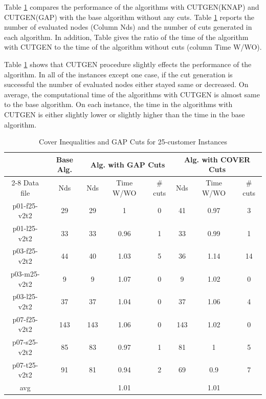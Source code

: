 Table \ref{knpgap25} compares the performance of the algorithms with
CUTGEN(KNAP) and CUTGEN(GAP) with the base algorithm without any cuts.
Table \ref{knpgap25} reports the number of evaluated nodes (Column Nds)
and the number of cuts generated in each algorithm. In addition, Table gives
the ratio of the time of the algorithm with CUTGEN to the time of the algorithm
without cuts (column Time W/WO).

Table \ref{knpgap25} shows that CUTGEN procedure slightly effects the
performance of the algorithm.  In all of the instances except one case,
if the cut generation is successful the number of evaluated nodes
either stayed same or decreased. On average, the computational time
of the algorithms with CUTGEN is almost same to the base algorithm.
On each instance, the time in the algorithms with CUTGEN is either slightly
lower or slightly higher than the time in the base algorithm.

\begin{table}[h!tbp]
\centering
\caption{Cover Inequalities and GAP Cuts for 25-customer Instances}\label{knpgap25}
\begin {tabular}[t]{|c|c|c|c|c|c|c|c|}
\hline
\mbox{} & Base Alg. & \multicolumn{3}{|c|}{Alg. with GAP Cuts} & \multicolumn{3}{|c|}{Alg. with COVER Cuts} \\\cline{2-8}
Data file & Nds & Nds & Time W/WO & \# cuts & Nds & Time W/WO & \# cuts \\\hline
p01-f25-v2t2 &  29 &    29 &    1       & 0 &   41 &    0.97    & 3 \\
p01-l25-v2t2 &  33 &    33 &    0.96    & 1 &   33 &    0.99    & 1 \\
p03-f25-v2t2 &  44 &    40 &    1.03    & 5 &   36 &    1.14    & 14    \\
p03-m25-v2t2 &  9 & 9 & 1.07    & 0 &   9  &    1.02    & 0 \\
p03-l25-v2t2 &  37 &    37 &    1.04    & 0 &   37 &    1.06    & 4 \\
p07-f25-v2t2 &  143 &   143 &   1.06    & 0 &   143 &   1.02    & 0 \\
p07-s25-v2t2 &  85 &    83 &    0.97    & 1 &   81 &    1   & 5 \\
p07-t25-v2t2 &  91 &    81 &    0.94    & 2 &   69 &    0.9 & 7 \\\hline
avg & \mbox{} & \mbox{} &   1.01    & \mbox{} & \mbox{} & 1.01 & \mbox{} \\\hline
\end{tabular}
\end{table}

